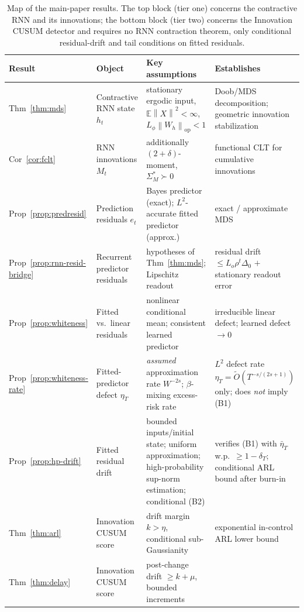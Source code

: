 \documentclass[bj,authoryear]{imsart}
\theoremstyle{plain}
\theoremstyle{definition}
\newcommand{\E}{\mathbb{E}}
\newcommand{\norm}[1]{\left\lVert #1 \right\rVert}
\begin{document}
\begin{table}[ht]
\centering
\footnotesize
\caption{Map of the main-paper results.  The top block (tier one) concerns
  the contractive RNN and its innovations; the bottom block (tier two)
  concerns the Innovation CUSUM detector and requires no RNN contraction
  theorem, only conditional residual-drift and tail conditions on
  fitted residuals.}
\label{tab:assumption-map}
\renewcommand{\arraystretch}{1.2}
\begin{tabular}{@{}l p{2.3cm} p{4.0cm} p{3.4cm}@{}}
\toprule
Result & Object & Key assumptions & Establishes \\
\midrule
Thm~\ref{thm:mds} & Contractive RNN state $h_t$
  & stationary ergodic input, $\E\norm{X}^2<\infty$,
    $L_\phi\norm{W_h}_{\mathrm{op}}<1$
  & Doob/MDS decomposition; geometric innovation stabilization \\
Cor~\ref{cor:fclt} & RNN innovations $M_t$
  & additionally $(2{+}\delta)$-moment, $\Sigma_M^*\succ0$
  & functional CLT for cumulative innovations \\
Prop~\ref{prop:predresid} & Prediction residuals $e_t$
  & Bayes predictor (exact); $L^2$-accurate fitted predictor (approx.)
  & exact / approximate MDS \\
Prop~\ref{prop:rnn-resid-bridge} & Recurrent predictor residuals
  & hypotheses of Thm~\ref{thm:mds}; Lipschitz readout
  & residual drift $\leq L_o\rho^t\Delta_0$ $+$ stationary readout error \\
Prop~\ref{prop:whiteness} & Fitted vs.\ linear residuals
  & nonlinear conditional mean; consistent learned predictor
  & irreducible linear defect; learned defect $\to0$ \\
Prop~\ref{prop:whiteness-rate} & Fitted-predictor defect $\eta_T$
  & \emph{assumed} approximation rate $W^{-2s}$; $\beta$-mixing excess-risk rate
  & $L^2$ defect rate $\eta_T=\widetilde O(T^{-s/(2s+1)})$ only; does \emph{not}
    imply (B1) \\
Prop~\ref{prop:hp-drift} & Fitted residual drift
  & bounded inputs/initial state; uniform approximation; high-probability
    sup-norm estimation; conditional (B2)
  & verifies (B1) with $\bar\eta_T$ w.p.\ $\ge1-\delta_T$; conditional ARL
    bound after burn-in \\
\midrule
Thm~\ref{thm:arl} & Innovation CUSUM score
  & drift margin $k>\eta$, conditional sub-Gaussianity
  & exponential in-control ARL lower bound \\
Thm~\ref{thm:delay} & Innovation CUSUM score
  & post-change drift $\geq k+\mu$, bounded increments

\end{tabular}
\end{table}
\end{document}
